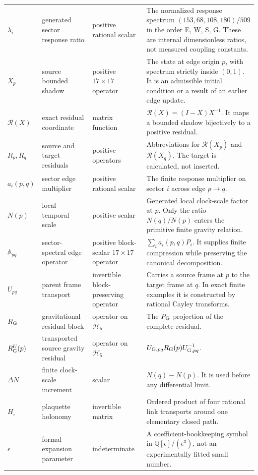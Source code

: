 \documentclass[11pt]{article}
\numberwithin{equation}{section}
\theoremstyle{remark}
\newcommand{\Q}{\mathbb{Q}}
\begin{document}
\begin{longtable}{p{2.1cm}p{3.1cm}p{3.2cm}p{5.6cm}}
$\lambda_i$ & generated sector response ratio & positive rational scalar & The normalized response spectrum $(153,68,108,180)/509$ in the order E, W, S, G. These are internal dimensionless ratios, not measured coupling constants.\\
$X_p$ & source bounded shadow & positive $17\times17$ operator & The state at edge origin $p$, with spectrum strictly inside $(0,1)$. It is an admissible initial condition or a result of an earlier edge update.\\
$\mathcal R(X)$ & exact residual coordinate & matrix function & $\mathcal R(X)=(I-X)X^{-1}$. It maps a bounded shadow bijectively to a positive residual.\\
$R_p,R_q$ & source and target residuals & positive operators & Abbreviations for $\mathcal R(X_p)$ and $\mathcal R(X_q)$. The target is calculated, not inserted.\\
$a_i(p,q)$ & sector edge multiplier & positive rational scalar & The finite response multiplier on sector $i$ across edge $p\to q$.\\
$N(p)$ & local temporal scale & positive scalar & Generated local clock-scale factor at $p$. Only the ratio $N(q)/N(p)$ enters the primitive finite gravity relation.\\
$\mathbb A_{pq}$ & sector-spectral edge operator & positive block-scalar $17\times17$ operator & $\sum_i a_i(p,q)P_i$. It supplies finite compression while preserving the canonical decomposition.\\
$U_{pq}$ & parent frame transport & invertible block-preserving operator & Carries a source frame at $p$ to the target frame at $q$. In exact finite examples it is constructed by rational Cayley transforms.\\
$R_{\rm G}$ & gravitational residual block & operator on $\mathcal H_5$ & The $P_{\rm G}$ projection of the complete residual.\\
$R_{\rm G}^{U}(p)$ & transported source gravity residual & operator on $\mathcal H_5$ & $U_{{\rm G},pq}R_{\rm G}(p)U_{{\rm G},pq}^{-1}$.\\
$\Delta N$ & finite clock-scale increment & scalar & $N(q)-N(p)$. It is used before any differential limit.\\
$H_{\square}$ & plaquette holonomy & invertible matrix & Ordered product of four rational link transports around one elementary closed path.\\
$\epsilon$ & formal expansion parameter & indeterminate & A coefficient-bookkeeping symbol in $\Q[\epsilon]/(\epsilon^3)$, not an experimentally fitted small number.\\

\end{longtable}
\end{document}
